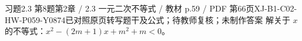 \par\noindent\begin{minipage}{\linewidth}
\begin{bankitem}{习题2.3 第8题}{第2章 / 2.3 一元二次不等式 / 教材 p.59 / PDF 第66页}{XJ-B1-C02-HW-P059-Y0874}{已对照原页转写题干及公式；待教师复核；未制作答案}
解关于 $x$ 的不等式：$x^2-(2m+1)x+m^2+m<0$。
\end{bankitem}
\end{minipage}\par\medskip
